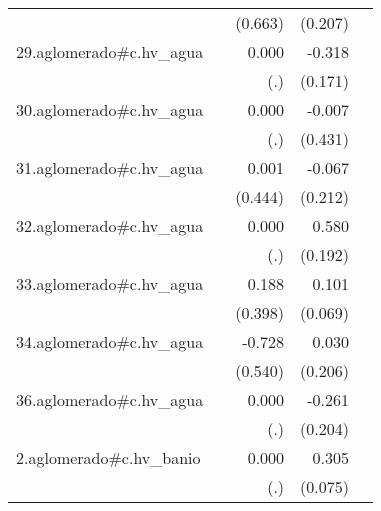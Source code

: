 {\begin{longtable}{l*{4}{D{.}{.}{-1}}}
            &                     &     (0.663)         &     (0.207)         &                     \\
\addlinespace
29.aglomerado#c.hv\_agua&                     &       0.000         &      -0.318         &                     \\
            &                     &         (.)         &     (0.171)         &                     \\
\addlinespace
30.aglomerado#c.hv\_agua&                     &       0.000         &      -0.007         &                     \\
            &                     &         (.)         &     (0.431)         &                     \\
\addlinespace
31.aglomerado#c.hv\_agua&                     &       0.001         &      -0.067         &                     \\
            &                     &     (0.444)         &     (0.212)         &                     \\
\addlinespace
32.aglomerado#c.hv\_agua&                     &       0.000         &       0.580\sym{**} &                     \\
            &                     &         (.)         &     (0.192)         &                     \\
\addlinespace
33.aglomerado#c.hv\_agua&                     &       0.188         &       0.101         &                     \\
            &                     &     (0.398)         &     (0.069)         &                     \\
\addlinespace
34.aglomerado#c.hv\_agua&                     &      -0.728         &       0.030         &                     \\
            &                     &     (0.540)         &     (0.206)         &                     \\
\addlinespace
36.aglomerado#c.hv\_agua&                     &       0.000         &      -0.261         &                     \\
            &                     &         (.)         &     (0.204)         &                     \\
\addlinespace
2.aglomerado#c.hv\_banio&                     &       0.000         &       0.305\sym{***}&                     \\
            &                     &         (.)         &     (0.075)         &                     \\

\end{longtable}}
